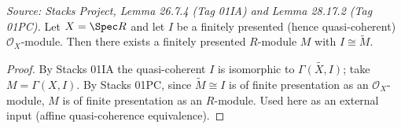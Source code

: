 \begin{theorem}
  \label{thm:stacks_affine_fp_tilde}
  \textit{Source: Stacks Project, Lemma 26.7.4 (Tag 01IA) and Lemma 28.17.2 (Tag 01PC).}
  Let $X = \Spec R$ and let $I$ be a finitely presented (hence quasi-coherent)
  $\mathcal{O}_X$-module. Then there exists a finitely presented $R$-module $M$
  with $I \cong \widetilde M$.
  \begin{proof}
    By Stacks 01IA the quasi-coherent $I$ is isomorphic to
    $\widetilde{\Gamma(X, I)}$; take $M = \Gamma(X, I)$. By Stacks 01PC, since
    $\widetilde M \cong I$ is of finite presentation as an $\mathcal{O}_X$-module,
    $M$ is of finite presentation as an $R$-module. Used here as an external
    input (affine quasi-coherence equivalence).
  \end{proof}
\end{theorem}

